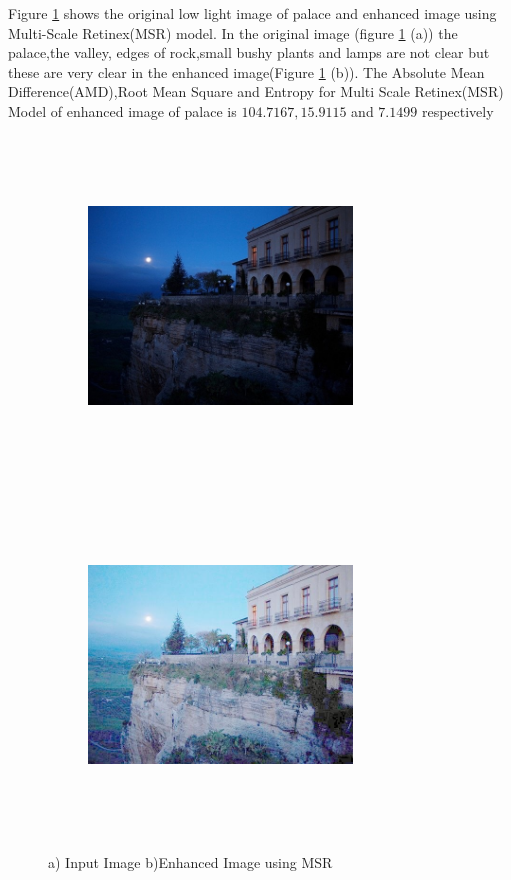 Figure \ref{fig:msrPalace} shows the original low light image of palace and enhanced image using Multi-Scale Retinex(MSR) model. In the original image (figure \ref{fig:msrPalace} (a))  the palace,the valley, edges of rock,small bushy plants and lamps are not clear but these are very clear in the enhanced image(Figure \ref{fig:msrPalace} (b)). The Absolute Mean Difference(AMD),Root Mean Square and Entropy for Multi Scale Retinex(MSR) Model of enhanced image of palace is $104.7167, 15.9115$ and $7.1499$ respectively      

\begin{figure}[!htb]
	\begin{subfigure}{8cm}
		\centering    
    	\includegraphics[width=7cm,height=9cm,keepaspectratio]{images/ch5/palace_input.jpg}
    	\caption{} 
    \end{subfigure}
  	\begin{subfigure}{6cm}
  		\centering
  		\includegraphics[width=7cm,height=9cm,keepaspectratio]{images/ch5/palace_msr.jpg}
   		\caption{}
  	\end{subfigure}
  	\caption{a) Input Image b)Enhanced Image using MSR}
  	\label{fig:msrPalace}
\end{figure}

